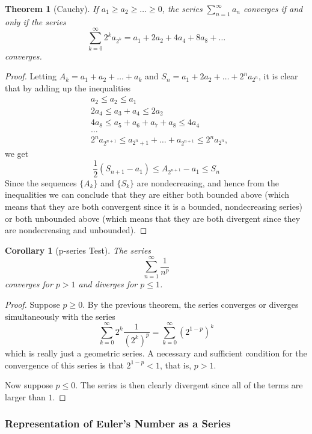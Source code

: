 \documentclass{article}
\newtheorem{theorem}{Theorem}[section]
\newtheorem{corollary}{Corollary}[theorem]
\theoremstyle{remark}
\theoremstyle{definition}
\begin{document}
\begin{theorem}[Cauchy]
If $a_1 \geq a_2 \geq \ldots \geq 0$, the series $\sum_{n=1}^\infty a_n$ converges if and only if the series 
\[\sum_{k=0}^\infty 2^k a_{2^k} = a_1 + 2 a_2 + 4a_4 + 8a_8 + \ldots \]
converges. 
\end{theorem}
\begin{proof}
Letting $A_k = a_1 + a_2 + \ldots + a_k$ and $S_n = a_1 + 2a_2 + \ldots + 2^n a_{2^n}$, it is clear that by adding up the inequalities
\begin{align*}
    & a_2 \leq a_2 \leq a_1 \\
    & 2a_4 \leq a_3 + a_4 \leq 2a_2 \\
    & 4a_8 \leq a_5 + a_6 + a_7 + a_8 \leq 4a_4 \\
    & \ldots \\
    & 2^n a_{2^{n+1}} \leq a_{2^n + 1} + \ldots + a_{2^{n+1}} \leq 2^n a_{2^n}, 
\end{align*}
we get
\[\frac{1}{2}(S_{n+1} - a_1) \leq A_{2^{n+1}} - a_1 \leq S_n\]
Since the sequences $\{A_k\}$ and $\{S_k\}$ are nondecreasing, and hence from the inequalities we can conclude that they are either both bounded above (which means that they are both convergent since it is a bounded, nondecreasing series) or both unbounded above (which means that they are both divergent since they are nondecreasing and unbounded). 
\end{proof}

\begin{corollary}[p-series Test]
The series 
\[\sum_{n=1}^\infty \frac{1}{n^p}\]
converges for $p>1$ and diverges for $p \leq 1$. 
\end{corollary}
\begin{proof}
Suppose $p\geq 0$. By the previous theorem, the series converges or diverges simultaneously with the series 
\[\sum_{k=0}^\infty 2^k \frac{1}{(2^k)^p} = \sum_{k=0}^\infty (2^{1-p})^k\]
which is really just a geometric series. A necessary and sufficient condition for the convergence of this series is that $2^{1-p} < 1$, that is, $p>1$. 

Now suppose $p \leq 0$. The series is then clearly divergent since all of the terms are larger than $1$. 
\end{proof}

\subsubsection{Representation of Euler's Number as a Series}
\end{document}
